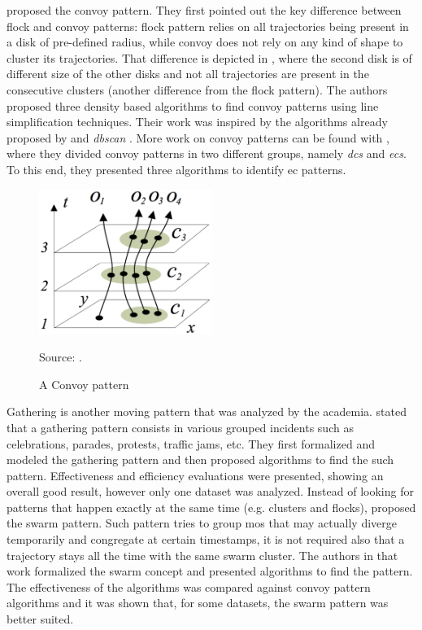  proposed the convoy pattern. They first pointed out the key difference between flock and
convoy patterns: flock pattern relies on all trajectories being present in a disk of pre-defined radius, while convoy
does not rely on any kind of shape to cluster its trajectories. That difference is depicted in
, where the second disk is of different size of the other disks and not all trajectories are
present in the consecutive clusters (another difference from the flock pattern). The authors proposed three density
based algorithms to find convoy patterns using line simplification techniques. Their work was inspired by the algorithms
already proposed by  and \textit{\ac{dbscan}} \cite{dbscan}. More work on convoy patterns can
be found with , where they divided convoy patterns in two different groups, namely \textit{\acp{dc}}
and \textit{\acp{ec}}. To this end, they presented three algorithms to identify \ac{ec} patterns.

\begin{figure}
    \centering
    \caption{A Convoy pattern}
    \centerline{\includegraphics[width=0.5\textwidth]{images/convoy.eps}}
    \footnotesize{Source: \cite{convoy2}.}
    \label{fig:convoy_pattern}
\end{figure}

Gathering is another moving pattern that was analyzed by the academia.  stated that a gathering
pattern consists in various grouped incidents such as celebrations, parades, protests, traffic jams, etc. They first
formalized and modeled the gathering pattern and then proposed algorithms to find the such pattern. Effectiveness and
efficiency evaluations were presented, showing an overall good result, however only one dataset was analyzed. Instead
of looking for patterns that happen exactly at the same time (e.g. clusters and flocks),  proposed the
swarm pattern. Such pattern tries to group \acp{mo} that may actually diverge temporarily and congregate at certain
timestamps, it is not required also that a trajectory stays all the time with the same swarm cluster. The authors in
that work formalized the swarm concept and presented algorithms to find the pattern. The effectiveness of the algorithms
was compared against convoy pattern algorithms and it was shown that, for some datasets, the swarm pattern was better
suited.

